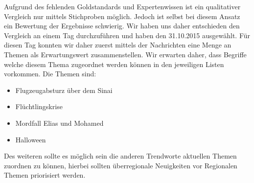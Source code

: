 Aufgrund des fehlenden Goldstandards und Expertenwissen ist ein qualitativer Vergleich nur mittels Stichproben möglich. Jedoch ist selbst bei diesem Ansatz ein Bewertung der Ergebnisse schwierig. Wir haben uns daher entschieden den Vergleich an einem Tag durchzuführen und haben den 31.10.2015 ausgewählt. 
Für diesen Tag konnten wir daher zuerst mittels der Nachrichten eine Menge an Themen als Erwartungswert zusammenstellen. Wir erwarten daher, dass Begriffe welche diesem Thema zugeordnet werden können in den jeweiligen Listen vorkommen. Die Themen sind:
\begin{itemize}
	\item Flugzeugabsturz über dem Sinai
	\item Flüchtlingskrise
	\item Mordfall Elias und Mohamed
	\item Halloween
\end{itemize} 
Des weiteren sollte es möglich sein die anderen Trendworte aktuellen Themen zuordnen zu können, hierbei sollten überregionale Neuigkeiten vor Regionalen Themen priorisiert werden. 


